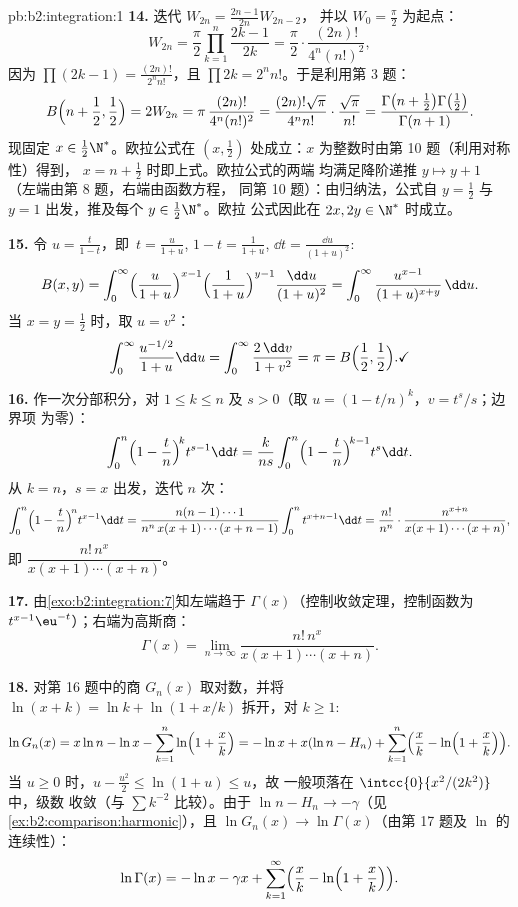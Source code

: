 \begin{solution}{pb:b2:integration:1}
\textbf{14.} 迭代 $W_{2n} = \frac{2n-1}{2n}W_{2n-2}$，
并以 $W_0 = \frac\pi2$ 为起点：
\[
W_{2n} = \frac\pi2\prod_{k=1}^{n}\frac{2k-1}{2k}
= \frac\pi2\cdot\frac{(2n)!}{4^n(n!)^2},
\]
因为 $\prod(2k-1) = \frac{(2n)!}{2^n n!}$，且 $\prod 2k = 2^n
n!$。于是利用第 3 题：
\[
B\Bigl(n+\frac12, \frac12\Bigr) = 2W_{2n}
= \pi\,\frac{(2n)!}{4^n(n!)^2}
= \frac{(2n)!\sqrt\pi}{4^n n!}\cdot\frac{\sqrt\pi}{n!}
= \frac{\Gamma\bigl(n+\frac12\bigr)\Gamma\bigl(\frac12\bigr)}
{\Gamma(n+1)} .
\]
现固定 $x \in \frac12\N^*$。欧拉公式在 $(x,
\frac12)$ 处成立：$x$ 为整数时由第 10 题（利用对称性）得到，
$x = n + \frac12$ 时即上式。欧拉公式的两端
均满足降阶递推 $y \mapsto y + 1$
（左端由第 8 题，右端由函数方程，
同第 10 题）：由归纳法，公式自 $y =
\frac12$ 与 $y = 1$ 出发，推及每个 $y \in \frac12\N^*$。欧拉
公式因此在 $2x, 2y \in \N^*$ 时成立。

\textbf{15.} 令 $u = \frac{t}{1-t}$，即\ $t =
\frac{u}{1+u}$, $1 - t = \frac{1}{1+u}$, $\dd t =
\frac{\dd u}{(1+u)^2}$:
\[
B(x,y) = \int_0^\infty
\Bigl(\frac{u}{1+u}\Bigr)^{x-1}
\Bigl(\frac{1}{1+u}\Bigr)^{y-1}
\frac{\dd u}{(1+u)^2}
= \int_0^\infty \frac{u^{x-1}}{(1+u)^{x+y}}\,\dd u .
\]
当 $x = y = \frac12$ 时，取 $u = v^2$：
\[
\int_0^\infty \frac{u^{-1/2}}{1+u}\dd u
= \int_0^\infty \frac{2\,\dd v}{1+v^2} = \pi
= B\Bigl(\frac12,\frac12\Bigr) . \checkmark
\]

\textbf{16.} 作一次分部积分，对 $1 \leq k \leq n$
及 $s > 0$（取 $u = (1 - t/n)^k$，$v = t^s/s$；边界项
为零）：
\[
\int_0^n \Bigl(1-\frac tn\Bigr)^{\!k} t^{s-1}\dd t
= \frac{k}{ns}\int_0^n \Bigl(1-\frac tn\Bigr)^{\!k-1}
t^{s}\dd t .
\]
从 $k = n$，$s = x$ 出发，迭代 $n$ 次：
\[
\int_0^n \Bigl(1-\frac tn\Bigr)^{\!n} t^{x-1}\dd t
= \frac{n(n-1)\cdots1}{n^n\,x(x+1)\cdots(x+n-1)}
\int_0^n t^{x+n-1}\dd t
= \frac{n!}{n^n}\cdot
\frac{n^{x+n}}{x(x+1)\cdots(x+n)} ,
\]
即 $\dfrac{n!\,n^x}{x(x+1)\cdots(x+n)}$。

\textbf{17.} 由\cref{exo:b2:integration:7}知左端趋于
$\Gamma(x)$（控制收敛定理，控制函数为
$t^{x-1}\eu^{-t}$）；右端为高斯商：
\[
\Gamma(x) = \lim_{n\to\infty}
\frac{n!\,n^x}{x(x+1)\cdots(x+n)} .
\]

\textbf{18.} 对第 16 题中的商
$G_n(x)$ 取对数，并将 $\ln(x+k) = \ln k + \ln(1 + x/k)$ 拆开，对 $k
\geq 1$:
\[
\ln G_n(x) = x\ln n - \ln x - \sum_{k=1}^n
\ln\Bigl(1+\frac xk\Bigr)
= -\ln x + x(\ln n - H_n)
+ \sum_{k=1}^n\Bigl(\frac xk -
\ln\Bigl(1+\frac xk\Bigr)\Bigr).
\]
当 $u \geq 0$ 时，$u - \frac{u^2}2 \leq \ln(1+u) \leq u$，故
一般项落在 $\intcc{0}{x^2/(2k^2)}$ 中，级数
收敛（与 $\sum k^{-2}$ 比较）。由于 $\ln n - H_n
\to -\gamma$（见\cref{ex:b2:comparison:harmonic}），且 $\ln G_n(x)
\to \ln\Gamma(x)$（由第 17 题及 $\ln$ 的连续性）：
\[
\ln\Gamma(x) = -\ln x - \gamma x
+ \sum_{k=1}^\infty\Bigl(\frac xk -
\ln\Bigl(1+\frac xk\Bigr)\Bigr) .
\]


\end{solution}
